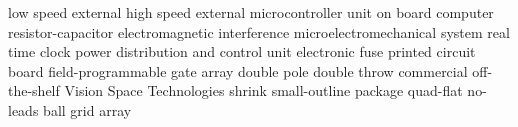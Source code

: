      {low speed external}
     {high speed external}
     {microcontroller unit}
     {on board computer}
      {resistor-capacitor}
     {electromagnetic interference}
    {microelectromechanical system}
     {real time clock}
    {power distribution and control unit}
   {electronic fuse}
     {printed circuit board}
    {field-programmable gate array}
    {double pole double throw}
    {commercial off-the-shelf}
     {Vision Space Technologies}
    {shrink small-outline package}
     {quad-flat no-leads}
     {ball grid array}
